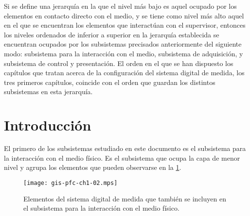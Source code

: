 Si se define una jerarquía en la que el nivel más bajo es aquel ocupado por
los elementos en contacto directo con el medio, y se tiene como nivel más
alto aquel en el que se encuentran los elementos que interactúan con el
supervisor, entonces los niveles ordenados de inferior a superior en la
jerarquía establecida se encuentran ocupados por los subsistemas precisados
anteriormente del siguiente modo: subsistema para la interacción con el
medio, subsistema de adquisición, y subsistema de control y presentación.
El orden en el que se han dispuesto los capítulos que tratan acerca de la
configuración del sistema digital de medida, los tres primeros capítulos,
coincide con el orden que guardan los distintos subsistemas en esta
jerarquía.


\section{Introducción}

El primero de los subsistemas estudiado en este documento es el subsistema
para la interacción con el medio físico. Es el subsistema que ocupa la capa
de menor nivel y agrupa los elementos que pueden observarse en la
\cref{fig:submedium}.

\begin{figure}
	\begin{center}
		\texttt{[image: gis-pfc-ch1-02.mps]}
	\end{center}
	\caption[Subsistema para la interacción con el medio físico]
	{Elementos del sistema digital de medida que también se incluyen en
	el subsistema para la interacción con el medio físico.}
	\label{fig:submedium}
\end{figure}

